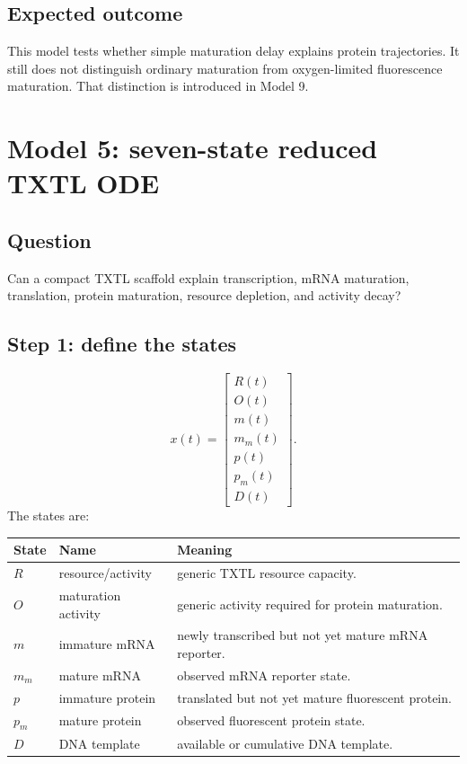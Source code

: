 \documentclass[11pt]{article}
\begin{document}
\subsection{Expected outcome}

This model tests whether simple maturation delay explains protein trajectories. It still does not distinguish ordinary maturation from oxygen-limited fluorescence maturation. That distinction is introduced in Model 9.

\section{Model 5: seven-state reduced TXTL ODE}

\subsection{Question}
Can a compact TXTL scaffold explain transcription, mRNA maturation, translation, protein maturation, resource depletion, and activity decay?

\subsection{Step 1: define the states}

\begin{equation}
    x(t)=
    \begin{bmatrix}
        R(t)\\
        O(t)\\
        m(t)\\
        m_m(t)\\
        p(t)\\
        p_m(t)\\
        D(t)
    \end{bmatrix}.
\end{equation}
The states are:
\begin{center}
\begin{tabularx}{\textwidth}{llX}
\toprule
State & Name & Meaning \\
\midrule
$R$ & resource/activity & generic TXTL resource capacity. \\
$O$ & maturation activity & generic activity required for protein maturation. \\
$m$ & immature mRNA & newly transcribed but not yet mature mRNA reporter. \\
$m_m$ & mature mRNA & observed mRNA reporter state. \\
$p$ & immature protein & translated but not yet mature fluorescent protein. \\
$p_m$ & mature protein & observed fluorescent protein state. \\
$D$ & DNA template & available or cumulative DNA template. \\
\bottomrule
\end{tabularx}
\end{center}
\end{document}
